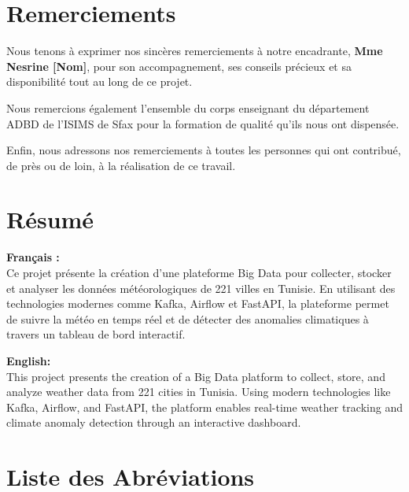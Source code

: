 \documentclass[a4paper,12pt,oneside]{report}
\begin{document}
\chapter*{Remerciements}

Nous tenons à exprimer nos sincères remerciements à notre encadrante, \textbf{Mme Nesrine [Nom]}, pour son accompagnement, ses conseils précieux et sa disponibilité tout au long de ce projet.

Nous remercions également l'ensemble du corps enseignant du département ADBD de l'ISIMS de Sfax pour la formation de qualité qu'ils nous ont dispensée.

Enfin, nous adressons nos remerciements à toutes les personnes qui ont contribué, de près ou de loin, à la réalisation de ce travail.

\newpage

\chapter*{Résumé}

\textbf{Français :}\\
Ce projet présente la création d'une plateforme Big Data pour collecter, stocker et analyser les données météorologiques de 221 villes en Tunisie. En utilisant des technologies modernes comme Kafka, Airflow et FastAPI, la plateforme permet de suivre la météo en temps réel et de détecter des anomalies climatiques à travers un tableau de bord interactif.

\vspace{0.8cm}
\textbf{English:}\\
This project presents the creation of a Big Data platform to collect, store, and analyze weather data from 221 cities in Tunisia. Using modern technologies like Kafka, Airflow, and FastAPI, the platform enables real-time weather tracking and climate anomaly detection through an interactive dashboard.

\newpage

\chapter*{Liste des Abréviations}
\end{document}
